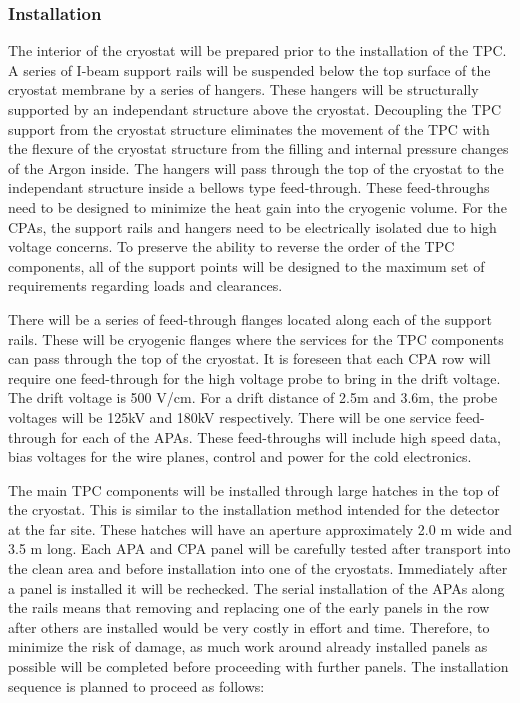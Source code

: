 \subsubsection{Installation}

The interior of the cryostat will be prepared prior to the installation of the TPC.  A series of I-beam support rails will be suspended below the top surface of the cryostat membrane by a series of hangers.  These hangers will be structurally supported by an independant structure above the cryostat.  Decoupling the TPC support from the cryostat structure eliminates the movement of the TPC with the flexure of the cryostat structure from the filling and internal pressure changes of the Argon inside.  The hangers will pass through the top of the cryostat to the independant structure inside a bellows type feed-through.  These feed-throughs need to be designed to minimize the heat gain into the cryogenic volume.  For the CPAs, the support rails and hangers need to be electrically isolated due to high voltage concerns.  To preserve the ability to reverse the order of the TPC components, all of the support points will be designed to the maximum set of requirements regarding loads and clearances.  

There will be a series of feed-through flanges located along each of the support rails.  These will be cryogenic flanges where the services for the TPC components can pass through the top of the cryostat.  It is foreseen that each CPA row will require one feed-through for the high voltage probe to bring in the drift voltage.  The drift voltage is 500 V/cm.  For a drift distance of 2.5m and 3.6m, the probe voltages will be 125kV and 180kV respectively.  There will be one service feed-through for each of the APAs.  These feed-throughs will include high speed data, bias voltages for the wire planes, control and power for the cold electronics.  

The main TPC components will be installed through large hatches in the top of the cryostat.  This is 
similar to the installation method intended for the detector at the far site.  These hatches will have an 
aperture approximately 2.0 m wide and 3.5 m long.  Each APA and CPA panel will be carefully tested after transport into the clean area and before installation into one of the cryostats. Immediately after a panel is installed it will be rechecked. The serial installation of the APAs along the rails means that removing and replacing one of the early panels in the row after others are installed would be very costly in effort and time. Therefore, to minimize the risk of damage, as much work around already installed panels as possible will be completed before proceeding with further panels.
The installation sequence is planned to proceed as follows:

